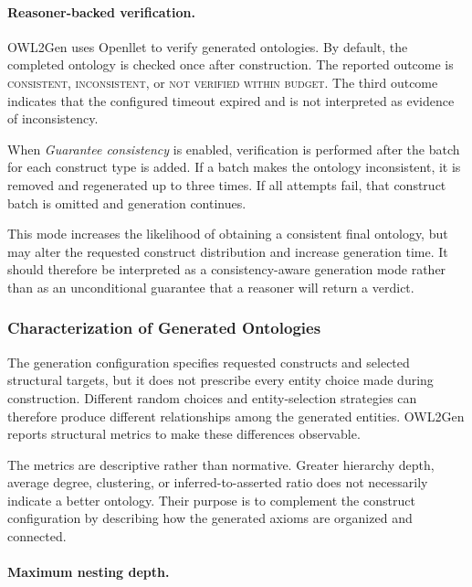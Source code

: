 \paragraph{Reasoner-backed verification.}

OWL2Gen uses Openllet to verify generated ontologies. By default, the
completed ontology is checked once after construction. The reported outcome
is \textsc{consistent}, \textsc{inconsistent}, or
\textsc{not verified within budget}. The third outcome indicates that the
configured timeout expired and is not interpreted as evidence of
inconsistency.

When \emph{Guarantee consistency} is enabled, verification is performed
after the batch for each construct type is added. If a batch makes the
ontology inconsistent, it is removed and regenerated up to three times.
If all attempts fail, that construct batch is omitted and generation
continues.

This mode increases the likelihood of obtaining a consistent final
ontology, but may alter the requested construct distribution and increase
generation time. It should therefore be interpreted as a
consistency-aware generation mode rather than as an unconditional
guarantee that a reasoner will return a verdict.


\subsubsection{Characterization of Generated Ontologies}
\label{sec:metrics_owl2gendl}

The generation configuration specifies requested constructs and selected
structural targets, but it does not prescribe every entity choice made
during construction. Different random choices and entity-selection
strategies can therefore produce different relationships among the
generated entities. OWL2Gen reports structural metrics to make these
differences observable.

The metrics are descriptive rather than normative. Greater hierarchy
depth, average degree, clustering, or inferred-to-asserted ratio does not
necessarily indicate a better ontology. Their purpose is to complement
the construct configuration by describing how the generated axioms are
organized and connected.


\paragraph{Maximum nesting depth.}

